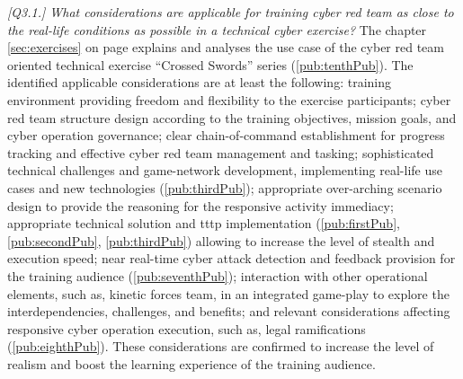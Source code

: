 \textit{[Q3.1.] What considerations are applicable for training cyber red team as close to the real-life conditions as possible in a technical cyber exercise?}
The chapter \ref{sec:exercises} on page \pageref{sec:exercises} explains and analyses the use case of the cyber red team oriented technical exercise ``Crossed Swords'' series (\ref{pub:tenthPub}).
The identified applicable considerations are at least the following: training environment providing freedom and flexibility to the exercise participants; cyber red team structure design according to the training objectives, mission goals, and cyber operation governance; clear chain-of-command establishment for progress tracking and effective cyber red team management and tasking; sophisticated technical challenges and game-network development, implementing real-life use cases and new technologies (\ref{pub:thirdPub}); appropriate over-arching scenario design to provide the reasoning for the responsive activity immediacy; appropriate technical solution and \gls{tttp} implementation (\ref{pub:firstPub}, \ref{pub:secondPub}, \ref{pub:thirdPub}) allowing to increase the level of stealth and execution speed; near real-time cyber attack detection and feedback provision for the training audience (\ref{pub:seventhPub}); interaction with other operational elements, such as, kinetic forces team, in an integrated game-play to explore the interdependencies, challenges, and benefits; and relevant considerations affecting responsive cyber operation execution, such as, legal ramifications (\ref{pub:eighthPub}). These considerations are confirmed to increase the level of realism and boost the learning experience of the training audience.

